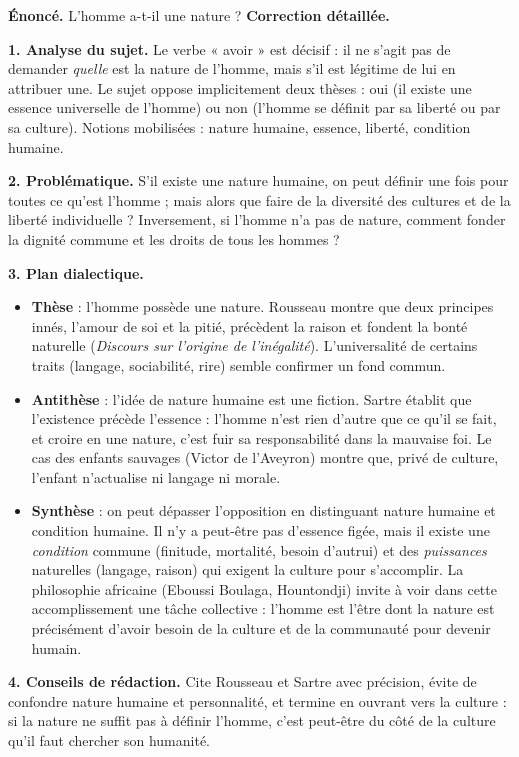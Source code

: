 \documentclass[11pt]{article}
\begin{document}
\begin{exoresolu}
\textbf{Énoncé.} L'homme a-t-il une nature ?
\tcblower
\textbf{Correction détaillée.}

\textbf{1. Analyse du sujet.} Le verbe « avoir » est décisif : il ne s'agit pas de demander \emph{quelle} est la nature de l'homme, mais s'il est légitime de lui en attribuer une. Le sujet oppose implicitement deux thèses : oui (il existe une essence universelle de l'homme) ou non (l'homme se définit par sa liberté ou par sa culture). Notions mobilisées : nature humaine, essence, liberté, condition humaine.

\textbf{2. Problématique.} S'il existe une nature humaine, on peut définir une fois pour toutes ce qu'est l'homme ; mais alors que faire de la diversité des cultures et de la liberté individuelle ? Inversement, si l'homme n'a pas de nature, comment fonder la dignité commune et les droits de tous les hommes ?

\textbf{3. Plan dialectique.}
\begin{itemize}
\item \textbf{Thèse} : l'homme possède une nature. Rousseau montre que deux principes innés, l'amour de soi et la pitié, précèdent la raison et fondent la bonté naturelle (\emph{Discours sur l'origine de l'inégalité}). L'universalité de certains traits (langage, sociabilité, rire) semble confirmer un fond commun.
\item \textbf{Antithèse} : l'idée de nature humaine est une fiction. Sartre établit que \guillemotleft l'existence précède l'essence \guillemotright : l'homme n'est rien d'autre que ce qu'il se fait, et croire en une nature, c'est fuir sa responsabilité dans la mauvaise foi. Le cas des enfants sauvages (Victor de l'Aveyron) montre que, privé de culture, l'enfant n'actualise ni langage ni morale.
\item \textbf{Synthèse} : on peut dépasser l'opposition en distinguant nature humaine et condition humaine. Il n'y a peut-être pas d'essence figée, mais il existe une \emph{condition} commune (finitude, mortalité, besoin d'autrui) et des \emph{puissances} naturelles (langage, raison) qui exigent la culture pour s'accomplir. La philosophie africaine (Eboussi Boulaga, Hountondji) invite à voir dans cette accomplissement une tâche collective : l'homme est l'être dont la nature est précisément d'avoir besoin de la culture et de la communauté pour devenir humain.
\end{itemize}

\textbf{4. Conseils de rédaction.} Cite Rousseau et Sartre avec précision, évite de confondre nature humaine et personnalité, et termine en ouvrant vers la culture : si la nature ne suffit pas à définir l'homme, c'est peut-être du côté de la culture qu'il faut chercher son humanité.
\end{exoresolu}
\end{document}
